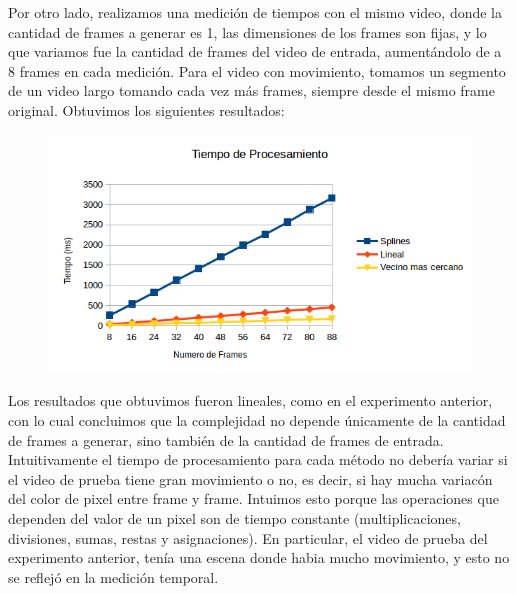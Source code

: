 Por otro lado, realizamos una medición de tiempos con el mismo video, donde la cantidad de frames a generar es 1,   las dimensiones de los frames son fijas, y lo que variamos fue la cantidad de frames del video de entrada, aumentándolo de a 8 frames en cada medición. Para el video con movimiento, tomamos un segmento de un video largo tomando cada vez más frames, siempre desde el mismo frame original. Obtuvimos los siguientes resultados:

\begin{figure}
  \vspace{-20pt}
  \begin{center}
    \includegraphics[scale= 0.6]{imagenes/aumentandoFramesMessi.png}
  \end{center}
  \vspace{-10pt}
  \vspace{-10pt}
\end{figure}

Los resultados que obtuvimos fueron lineales, como en el experimento anterior, con lo cual concluimos que la complejidad no depende únicamente de la cantidad de frames a generar, sino también de la cantidad de frames de entrada.\\


Intuitivamente el tiempo de procesamiento para cada método no debería variar si el video de prueba tiene gran movimiento o no, es decir, si hay mucha variacón del color de pixel entre frame y frame. Intuimos esto porque las operaciones que dependen del valor de un pixel son de tiempo constante (multiplicaciones, divisiones, sumas, restas y asignaciones). En particular, el video de prueba del experimento anterior, tenía una escena donde habia mucho movimiento, y esto no se reflejó en la medición temporal. \\

